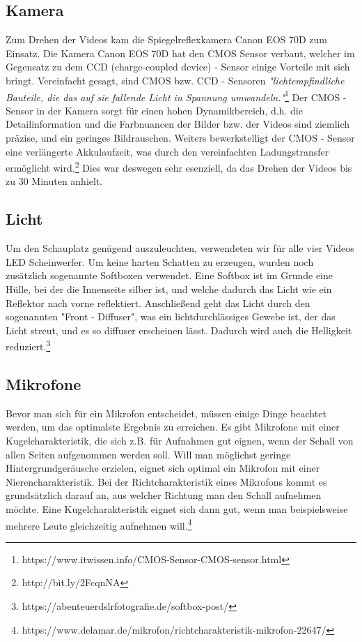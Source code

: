 \subsection{Kamera}
\renewcommand{\kapitelautor}{Autor: Kerstin Schön}
Zum Drehen der Videos kam die Spiegelreflexkamera Canon EOS 70D zum Einsatz. Die Kamera Canon EOS 70D hat den CMOS Sensor verbaut, welcher im Gegensatz zu dem CCD (charge-coupled device) - Sensor einige Vorteile mit sich bringt. Vereinfacht gesagt, sind CMOS bzw. CCD - Sensoren \textit{"lichtempfindliche Bauteile, die das auf sie fallende Licht in Spannung umwandeln."}\footnote{\label{foot:3}https://www.itwissen.info/CMOS-Sensor-CMOS-sensor.html}
Der CMOS - Sensor in der Kamera sorgt für einen hohen Dynamikbereich, d.h. die Detailinformation und die Farbnuancen der Bilder bzw. der Videos sind ziemlich präzise, und ein geringes Bildrauschen. Weiters bewerkstelligt der CMOS - Sensor eine verlängerte Akkulaufzeit, was durch den vereinfachten Ladungstransfer ermöglicht wird.\footnote{\label{foot:4}http://bit.ly/2FcqnNA} Dies war deswegen sehr esenziell, da das Drehen der Videos bis zu 30 Minuten anhielt.

\subsection{Licht}
\renewcommand{\kapitelautor}{Autor: Kerstin Schön}
Um den Schauplatz genügend auszuleuchten, verwendeten wir für alle vier Videos LED Scheinwerfer. Um keine harten Schatten zu erzeugen, wurden noch zusätzlich sogenannte Softboxen verwendet. Eine Softbox ist im Grunde eine Hülle, bei der die Innenseite silber ist, und welche dadurch das Licht wie ein Reflektor nach vorne reflektiert. Anschließend geht das Licht durch den sogenannten "Front - Diffuser", was ein lichtdurchlässiges Gewebe ist, der das Licht streut, und es so diffuser erscheinen lässt. Dadurch wird auch die Helligkeit reduziert.\footnote{\label{foot:4}https://abenteuerdslrfotografie.de/softbox-post/}

\subsection{Mikrofone}
\renewcommand{\kapitelautor}{Autor: Kerstin Schön}
Bevor man sich für ein Mikrofon entscheidet, müssen einige Dinge beachtet werden, um das optimalste Ergebnis zu erreichen. Es gibt Mikrofone mit einer Kugelcharakteristik, die sich z.B. für Aufnahmen gut eignen, wenn der Schall von allen Seiten aufgenommen werden soll. Will man möglichst geringe Hintergrundgeräusche erzielen, eignet sich optimal ein Mikrofon mit einer Nierencharakteristik. 
Bei der Richtcharakteristik eines Mikrofons kommt es grundsätzlich darauf an, aus welcher Richtung man den Schall aufnehmen möchte. Eine Kugelcharakteristik eignet sich dann gut, wenn man beispielsweise mehrere Leute gleichzeitig aufnehmen will.\footnote{\label{foot:5}https://www.delamar.de/mikrofon/richtcharakteristik-mikrofon-22647/}

